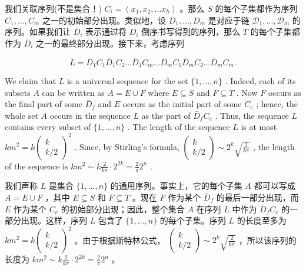 \documentclass[10pt]{article}
\begin{document}
\begin{tcolorbox}\relax
我们关联序列(不是集合！) \({C}_{i} = \left( {{x}_{1},{x}_{2},\ldots {x}_{h}}\right)\) 。那么 \(S\) 的每个子集都作为序列 \({C}_{1},\ldots ,{C}_{m}\) 之一的初始部分出现。类似地，设 \({D}_{1},\ldots ,{D}_{m}\) 是对应于链 \({\mathcal{D}}_{1},\ldots ,{\mathcal{D}}_{m}\) 的序列。如果我们让 \({\bar{D}}_{i}\) 表示通过将 \({D}_{i}\) 倒序书写得到的序列，那么 \(T\) 的每个子集都作为 \({\bar{D}}_{i}\) 之一的最终部分出现。接下来，考虑序列
\end{tcolorbox}

\[
L = {\bar{D}}_{1}{C}_{1}{\bar{D}}_{1}{C}_{2}\ldots {\bar{D}}_{1}{C}_{m}\ldots {\bar{D}}_{m}{C}_{1}{\bar{D}}_{m}{C}_{2}\ldots {\bar{D}}_{m}{C}_{m}.
\]

We claim that \(L\) is a universal sequence for the set \(\{ 1,\ldots ,n\}\) . Indeed, each of its subsets \(A\) can be written as \(A = E \cup  F\) where \(E \subseteq  S\) and \(F \subseteq  T\) . Now \(F\) occurs as the final part of some \({\bar{D}}_{f}\) and \(E\) occurs as the initial part of some \({C}_{e}\) ; hence, the whole set \(A\) occurs in the sequence \(L\) as the part of \({\bar{D}}_{f}{C}_{e}\) . Thus, the sequence \(L\) contains every subset of \(\{ 1,\ldots ,n\}\) . The length of the sequence \(L\) is at most \(k{m}^{2} = k{\left( \begin{matrix} k \\  k/2 \end{matrix}\right) }^{2}\) . Since, by Stirling’s formula, \(\left( \begin{matrix} k \\  k/2 \end{matrix}\right)  \sim  {2}^{k}\sqrt{\frac{2}{k\pi }}\) , the length of the sequence is \(k{m}^{2} \sim  k\frac{2}{k\pi } \cdot  {2}^{2k} = \frac{2}{\pi }{2}^{n}\) .

\begin{tcolorbox}\relax
我们声称 \(L\) 是集合 \(\{ 1,\ldots ,n\}\) 的通用序列。事实上，它的每个子集 \(A\) 都可以写成 \(A = E \cup  F\) ，其中 \(E \subseteq  S\) 和 \(F \subseteq  T\) 。现在 \(F\) 作为某个 \({\bar{D}}_{f}\) 的最后一部分出现，而 \(E\) 作为某个 \({C}_{e}\) 的初始部分出现；因此，整个集合 \(A\) 在序列 \(L\) 中作为 \({\bar{D}}_{f}{C}_{e}\) 的一部分出现。这样，序列 \(L\) 包含了 \(\{ 1,\ldots ,n\}\) 的每个子集。序列 \(L\) 的长度至多为 \(k{m}^{2} = k{\left( \begin{matrix} k \\  k/2 \end{matrix}\right) }^{2}\) 。由于根据斯特林公式， \(\left( \begin{matrix} k \\  k/2 \end{matrix}\right)  \sim  {2}^{k}\sqrt{\frac{2}{k\pi }}\) ，所以该序列的长度为 \(k{m}^{2} \sim  k\frac{2}{k\pi } \cdot  {2}^{2k} = \frac{2}{\pi }{2}^{n}\) 。
\end{tcolorbox}
\end{document}
